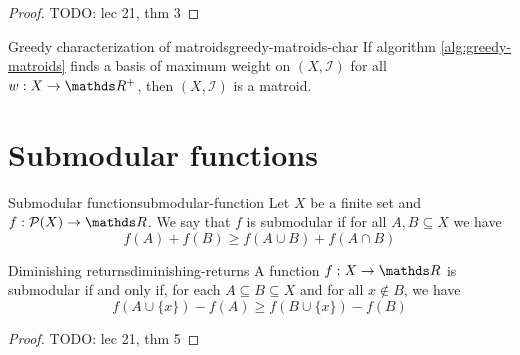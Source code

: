 \documentclass[12pt]{extarticle}
\begin{document}
\begin{proof}
	TODO: lec 21, thm 3
\end{proof}

\begin{proposition}{Greedy characterization of matroids}{greedy-matroids-char}
	If algorithm \ref{alg:greedy-matroids} finds a basis of maximum weight on $(X, \mathcal I)$
	for all $w: X \to \R^+$, then $(X, \mathcal I)$ is a matroid.
\end{proposition}

\section{Submodular functions}
\begin{definition}{Submodular function}{submodular-function}
	Let $X$ be a finite set and $f: \mathcal P(X) \to \R$.
	We say that $f$ is submodular if for all $A, B \subseteq X$ we have
	\begin{equation}
		f(A) + f(B) \geq f(A \cup B) + f(A \cap B)
	\end{equation}
\end{definition}

\begin{proposition}{Diminishing returns}{diminishing-returns}
	A function $f: X \to \R$ is submodular if and only if, for each $A \subseteq B \subseteq X$ and
	for all $x \notin B$, we have
	\begin{equation}
		f(A \cup \{x\}) - f(A) \geq f(B \cup \{ x\}) - f(B)
	\end{equation}
\end{proposition}

\begin{proof}
	TODO: lec 21, thm 5
\end{proof}
\end{document}
